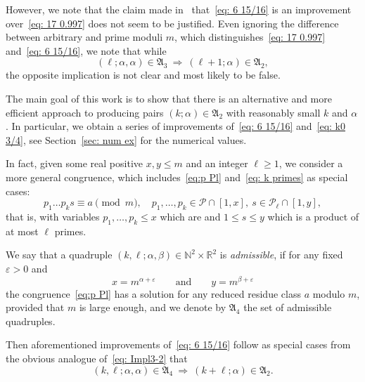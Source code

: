 \documentclass[12pt]{amsart}
\begin{document}
However, we note that the claim made in~\cite{Wal} that~\eqref{eq: 6 15/16} is an improvement
over~\eqref{eq: 17 0.997} does not seem to be justified. 
Even ignoring the difference between  
arbitrary and prime moduli $m$, which distinguishes~\eqref{eq: 17 0.997} and~\eqref{eq: 6 15/16}, 
we note that while 
\begin{equation}
\label{eq: Impl3-2}
(\ell; \alpha,  \alpha)   \in {{\mathfrak A}}_3 \  \Longrightarrow \ (\ell+1; \alpha)   \in {{\mathfrak A}}_2, 
\end{equation}
the opposite implication is not clear and most likely to be false. 

The main goal of this work is to show that there is an alternative and more efficient approach 
to producing pairs  $(k;\alpha) \in {{\mathfrak A}}_2 $ with reasonably small $k$ and $\alpha$. 
In particular, we obtain a series of improvements of~\eqref{eq: 6 15/16} and~\eqref{eq: k0 3/4},
see Section~\ref{sec: num ex} for the numerical values. 

In fact, given some real positive $x,y \le m$ and an integer $\ell \ge 1$,
 we consider a more general congruence, which includes~\eqref{eq:p Pl} and~\eqref{eq: k primes}
 as special cases: 
\begin{equation}
\label{eq: k l}
p_1\ldots p_k s\equiv a \pmod m, \quad p_1,\ldots, p_k \in {{\mathcal P}}  \cap [1,x], \ 
s \in {{\mathcal P}}_\ell \cap [1,y], 
\end{equation}
that is,  with  variables 
 $p_1,\ldots, p_k \le x$ which are and $1 \le s \le y$ which  is a product of at most $\ell$ primes. 

\begin{definition}
\label{def:quadr} 
We say that a quadruple  $(k,\ell; \alpha, \beta) \in {{\mathbb N}}^2 \times {{\mathbb R}}^2$ is {\it admissible\/}, 
if for any fixed $\varepsilon > 0$ and 
$$x = m^{\alpha+\varepsilon} {\qquad\mbox{and}\qquad} y = m^{\beta+\varepsilon}
$$  the congruence~\eqref{eq:p Pl}
has a solution for any reduced residue class $a$ modulo $m$, provided that $m$ is
large enough, and we denote by ${{\mathfrak A}}_4$ the set of admissible quadruples. 
\end{definition}

Then aforementioned improvements of~\eqref{eq: 6 15/16} follow as special cases 
from the obvious analogue of~\eqref{eq: Impl3-2} that 
\begin{equation}
\label{eq: Impl4-2}
(k,\ell; \alpha,  \alpha) \in {{\mathfrak A}}_4 \  \Longrightarrow \ (k+\ell; \alpha)   \in {{\mathfrak A}}_2.
\end{equation}
\end{document}
